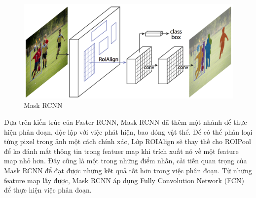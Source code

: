 \begin{center}
   \begin{figure}[H]
   \begin{center}
     \includegraphics[scale=.2]{image/maskrcnn}
    \end{center}
    \caption{Mask RCNN}
    \end{figure}
\end{center}

Dựa trên kiến trúc của Faster RCNN, Mask RCNN đã thêm một nhánh để thực hiện phân đoạn, độc lập với việc phát hiện, bao đóng vật thể. Để có thể phân loại từng pixel trong ảnh một cách chính xác, Lớp ROIAlign sẽ thay thế cho ROIPool để ko đánh mất thông tin trong featuer map khi trích xuất nó về một feature map nhỏ hơn. Đây cũng là một trong những điểm nhấn, cải tiến quan trọng của Mask RCNN để đạt được những kết quả tốt hơn trong việc phân đoạn. Từ những feature map lấy được, Mask RCNN áp dụng Fully Convolution Network (FCN) để thực hiện việc phân đoạn. 




